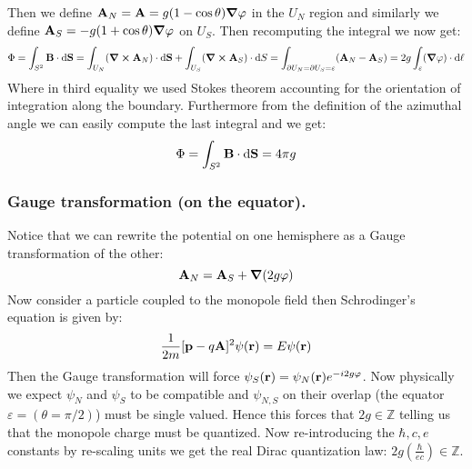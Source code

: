 \documentclass[10pt,a4paper]{book}
\begin{document}
\begin{figure}
\centering
{}
\end{figure} 
Then we define $\vb{A}_N = \vb{A} = g(1 - \cos\theta) \grad \varphi$ in the $U_N$ region and similarly we define $\vb{A}_S = -g(1 + \cos \theta) \grad \varphi$ on $U_S$. Then recomputing the integral we now get:
\[
\Phi = \int_{S^2} \vb{B} \cdot \dd \vb{S} = \int_{U_N} (\curl \vb{A}_N) \cdot \dd \vb{S} + \int_{U_S} (\curl \vb{A}_S) \cdot \dd S = \int_{\partial U_N = \partial U_S = \varepsilon} (\vb{A}_N - \vb{A}_S) = 2g \int_{\varepsilon} (\grad \varphi) \cdot \dd \vb{\ell}
\]
Where in third equality we used Stokes theorem accounting for the orientation of integration along the boundary. Furthermore from the definition of the azimuthal angle we can easily compute the last integral and we get:
\[
\Phi = \int_{S^2} \vb{B}\cdot \dd \vb{S} = 4 \pi g
\]
\subsubsection{Gauge transformation (on the equator).}
Notice that we can rewrite the potential on one hemisphere as a Gauge transformation of the other:
\[
\vb{A}_N = \vb{A}_S + \grad(2g \varphi)
\]
Now consider a particle coupled to the monopole field then Schrodinger's equation is given by:
\[
\frac{1}{2m} [\vb{p} - q \vb{A}]^2 \psi(\vb{r}) = E \psi(\vb{r})
\]
Then the Gauge transformation will force $\psi_S(\vb{r}) = \psi_N(\vb{r})e^{-i2g \varphi}$. Now physically we expect $\psi_N$ and $\psi_S$ to be compatible and $\psi_{N,S}$ on their overlap (the equator $\varepsilon = (\theta = \pi/2)$) must be single valued. Hence this forces that $2g \in \mathbb{Z}$ telling us that the monopole charge must be quantized. Now re-introducing the $\hbar, c, e$ constants by re-scaling units we get the real Dirac quantization law: $2 g \left(\frac{\hbar}{ec}\right) \in \mathbb{Z}$. 
\end{document}
